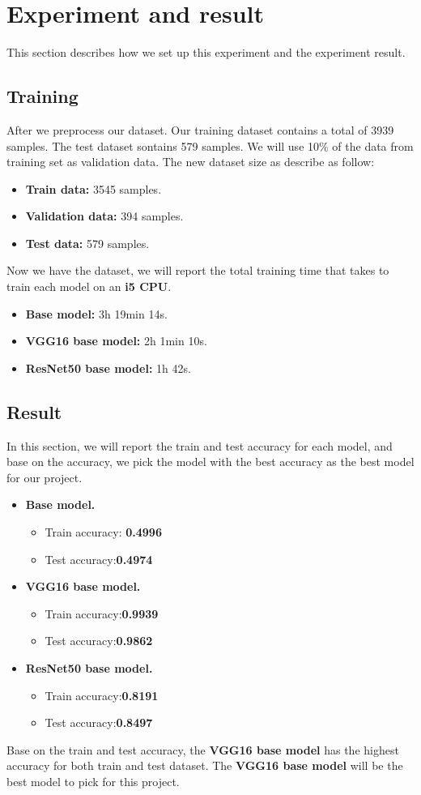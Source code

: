 \documentclass{article}
\begin{document}
\section{Experiment and result}
This section describes how we set up this experiment and the experiment result.  
\subsection{Training}
After we preprocess our dataset. Our training dataset contains a total of 3939 samples. The test dataset sontains 579 samples. We will use 10\% of the data from training set as validation data. The new dataset size as describe as follow:
\begin{itemize}
\item \textbf{Train data: }3545 samples.
\item \textbf{Validation data: }394 samples.
\item \textbf{Test data: }579 samples.
\end{itemize}
Now we have the dataset, we will report the total training time that takes to train each model on an \textbf{i5 CPU}.
\begin{itemize}
\item \textbf{Base model: }3h 19min 14s.
\item \textbf{VGG16 base model: }2h 1min 10s.
\item \textbf{ResNet50 base model: }1h 42s.
\end{itemize}
\subsection{Result}
In this section, we will report the train and test accuracy for each model, and base on the accuracy, we pick the model with the best accuracy as the best model for our project.
\begin{itemize}
\item \textbf{Base model.}
	\begin{itemize}
	\item Train accuracy: \textbf{0.4996}
	\item Test accuracy:\textbf{0.4974}
	\end{itemize}
\item \textbf{VGG16 base model.}
	\begin{itemize}
	\item Train accuracy:\textbf{0.9939}
	\item Test accuracy:\textbf{0.9862}
	\end{itemize}
\item \textbf{ResNet50 base model.}
	\begin{itemize}
	\item Train accuracy:\textbf{0.8191}
	\item Test accuracy:\textbf{0.8497}
	\end{itemize}
\end{itemize}
Base on the train and test accuracy, the \textbf{VGG16 base model} has the highest accuracy for both train and test dataset. The \textbf{VGG16 base model} will be the best model to pick for this project.
\end{document}
